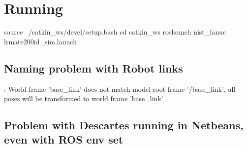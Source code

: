 \section*{Running }

\begin{DoxyVerb} source ~/catkin_ws/devel/setup.bash
 cd catkin_ws
 roslaunch nist_fanuc lrmate200id_sim.launch
\end{DoxyVerb}


\subsection*{Naming problem with Robot links }

\begin{DoxyVerb}[ WARN] [1456003348.287916295]: World frame 'base_link' does not match model root frame '/base_link', all poses will be transformed to world frame 'base_link'
\end{DoxyVerb}


\subsection*{Problem with Descartes running in Netbeans, even with R\-O\-S env set }

